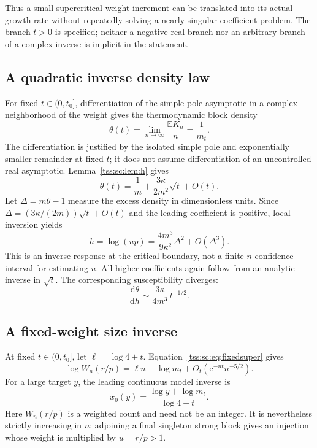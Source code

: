 \documentclass[11pt]{article}
\theoremstyle{remark}\newtheorem{remark}[theorem]{Remark}
\theoremstyle{definition}\newtheorem{definition}[theorem]{Definition}
\newcommand{\dd}{\mathrm d}
\newcommand{\e}{\mathrm e}
\newcommand{\E}{\mathbb E}
\begin{document}
Thus a small supercritical weight increment can be translated into its actual growth rate without repeatedly solving a nearly singular coefficient problem. The branch $t>0$ is specified; neither a negative real branch nor an arbitrary branch of a complex inverse is implicit in the statement.

\subsection{A quadratic inverse density law}
For fixed $t\in(0,t_0]$, differentiation of the simple-pole asymptotic in a complex neighborhood of the weight gives the thermodynamic block density
\begin{equation}\label{tss:sc:eq:density}
 \theta(t)=\lim_{n\to\infty}\frac{\E K_n}{n}=\frac1{m_t}.
\end{equation}
The differentiation is justified by the isolated simple pole and exponentially smaller remainder at fixed $t$; it does not assume differentiation of an uncontrolled real asymptotic. Lemma~\ref{tss:sc:lem:h} gives
\begin{equation}\label{tss:sc:eq:densityexp}
 \theta(t)=\frac1m+\frac{3\kappa}{2m^2}\sqrt t+O(t).
\end{equation}
Let $\Delta=m\theta-1$ measure the excess density in dimensionless units. Since
$\Delta=(3\kappa/(2m))\sqrt t+O(t)$ and the leading coefficient is positive, local inversion yields
\begin{equation}\label{tss:sc:eq:densityinverse}
 \boxed{\displaystyle
 h=\log(up)=\frac{4m^3}{9\kappa^2}\Delta^2+O(\Delta^3).}
\end{equation}
This is an inverse response at the critical boundary, not a finite-$n$ confidence interval for estimating $u$. All higher coefficients again follow from an analytic inverse in $\sqrt t$. The corresponding susceptibility diverges:
\begin{equation}\label{tss:sc:eq:susceptibility}
 \frac{\dd\theta}{\dd h}
 \sim\frac{3\kappa}{4m^3}\,t^{-1/2}.
\end{equation}

\subsection{A fixed-weight size inverse}
At fixed $t\in(0,t_0]$, let $\ell=\log4+t$. Equation~\eqref{tss:sc:eq:fixedsuper} gives
\begin{equation}\label{tss:sc:eq:logcount}
 \log W_n(r/p)=\ell n-\log m_t+O_t(\e^{-nt}n^{-5/2}).
\end{equation}
For a large target $y$, the leading continuous model inverse is
\begin{equation}\label{tss:sc:eq:sizeinverse}
 x_0(y)=\frac{\log y+\log m_t}{\log4+t}.
\end{equation}
Here $W_n(r/p)$ is a weighted count and need not be an integer. It is nevertheless strictly increasing in $n$: adjoining a final singleton strong block gives an injection whose weight is multiplied by $u=r/p>1$.
\end{document}
